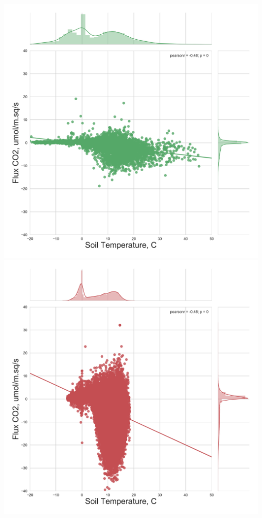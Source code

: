 \documentclass{beamer}
\begin{document}
\begin{frame}
\begin{columns}[t]
\centering
\includegraphics[width=\textwidth]{FvsT_day/CA-NS6.png}\\
\includegraphics[width=\textwidth]{FvsT_day/CA-Oas.png}

\end{columns}
\end{frame}
\end{document}
